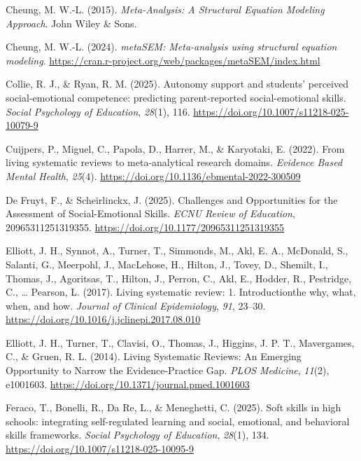 \documentclass[
  man,
  longtable,
  nolmodern,
  notxfonts,
  notimes,
  colorlinks=true,linkcolor=blue,citecolor=blue,urlcolor=blue]{apa7}
\newlength{\cslhangindent}
\newenvironment{CSLReferences}[2] %
 {\begin{list}{}{%
  \setlength{\itemindent}{0pt}
  \setlength{\leftmargin}{0pt}
  \setlength{\parsep}{0pt}
  \ifodd #1
   \setlength{\leftmargin}{\cslhangindent}
   \setlength{\itemindent}{-1\cslhangindent}
  \fi
  \setlength{\itemsep}{#2\baselineskip}}}
 {\end{list}}
\begin{document}
\begin{CSLReferences}{1}{0}
Cheung, M. W.-L. (2015). \emph{Meta-Analysis: A Structural Equation
Modeling Approach}. John Wiley \& Sons.

Cheung, M. W.-L. (2024). \emph{metaSEM: Meta-analysis using structural
equation modeling}.
\url{https://cran.r-project.org/web/packages/metaSEM/index.html}

Collie, R. J., \& Ryan, R. M. (2025). Autonomy support and students{'}
perceived social-emotional competence: predicting parent-reported
social-emotional skills. \emph{Social Psychology of Education},
\emph{28}(1), 116. \url{https://doi.org/10.1007/s11218-025-10079-9}

Cuijpers, P., Miguel, C., Papola, D., Harrer, M., \& Karyotaki, E.
(2022). From living systematic reviews to meta-analytical research
domains. \emph{Evidence Based Mental Health}, \emph{25}(4).
\url{https://doi.org/10.1136/ebmental-2022-300509}

De Fruyt, F., \& Scheirlinckx, J. (2025). Challenges and Opportunities
for the Assessment of Social-Emotional Skills. \emph{ECNU Review of
Education}, 20965311251319355.
\url{https://doi.org/10.1177/20965311251319355}

Elliott, J. H., Synnot, A., Turner, T., Simmonds, M., Akl, E. A.,
McDonald, S., Salanti, G., Meerpohl, J., MacLehose, H., Hilton, J.,
Tovey, D., Shemilt, I., Thomas, J., Agoritsas, T., Hilton, J., Perron,
C., Akl, E., Hodder, R., Pestridge, C., \ldots{} Pearson, L. (2017).
Living systematic review: 1. Introduction{\textemdash}the why, what,
when, and how. \emph{Journal of Clinical Epidemiology}, \emph{91},
23--30. \url{https://doi.org/10.1016/j.jclinepi.2017.08.010}

Elliott, J. H., Turner, T., Clavisi, O., Thomas, J., Higgins, J. P. T.,
Mavergames, C., \& Gruen, R. L. (2014). Living Systematic Reviews: An
Emerging Opportunity to Narrow the Evidence-Practice Gap. \emph{PLOS
Medicine}, \emph{11}(2), e1001603.
\url{https://doi.org/10.1371/journal.pmed.1001603}

Feraco, T., Bonelli, R., Da Re, L., \& Meneghetti, C. (2025). Soft
skills in high schools: integrating self-regulated learning and social,
emotional, and behavioral skills frameworks. \emph{Social Psychology of
Education}, \emph{28}(1), 134.
\url{https://doi.org/10.1007/s11218-025-10095-9}


\end{CSLReferences}
\end{document}
